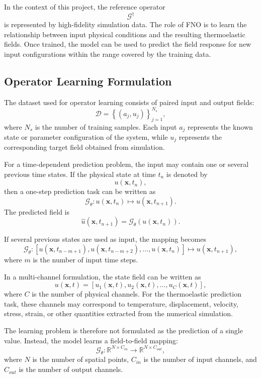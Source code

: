 \documentclass[14pt]{extarticle}
\begin{document}
In the context of this project, the reference operator
\[
\mathcal{G}^{\dagger}
\]
is represented by high-fidelity simulation data. The role of FNO is to learn the relationship between input physical conditions and the resulting thermoelastic fields. Once trained, the model can be used to predict the field response for new input configurations within the range covered by the training data.

\subsection{Operator Learning Formulation}

The dataset used for operator learning consists of paired input and output fields:
\[
\mathcal{D}
=
\left\{
\left(
a_j,
u_j
\right)
\right\}_{j=1}^{N_s},
\]
where \(N_s\) is the number of training samples. Each input \(a_j\) represents the known state or parameter configuration of the system, while \(u_j\) represents the corresponding target field obtained from simulation.

For a time-dependent prediction problem, the input may contain one or several previous time states. If the physical state at time \(t_n\) is denoted by
\[
u(\mathbf{x}, t_n),
\]
then a one-step prediction task can be written as
\[
\mathcal{G}_{\theta}:
u(\mathbf{x}, t_n)
\mapsto
u(\mathbf{x}, t_{n+1}).
\]
The predicted field is
\[
\hat{u}(\mathbf{x}, t_{n+1})
=
\mathcal{G}_{\theta}
\left(
u(\mathbf{x}, t_n)
\right).
\]

If several previous states are used as input, the mapping becomes
\[
\mathcal{G}_{\theta}:
\left[
u(\mathbf{x}, t_{n-m+1}),
u(\mathbf{x}, t_{n-m+2}),
\ldots,
u(\mathbf{x}, t_n)
\right]
\mapsto
u(\mathbf{x}, t_{n+1}),
\]
where \(m\) is the number of input time steps.

In a multi-channel formulation, the state field can be written as
\[
u(\mathbf{x}, t)
=
\left[
u_1(\mathbf{x}, t),
u_2(\mathbf{x}, t),
\ldots,
u_C(\mathbf{x}, t)
\right],
\]
where \(C\) is the number of physical channels. For the thermoelastic prediction task, these channels may correspond to temperature, displacement, velocity, stress, strain, or other quantities extracted from the numerical simulation.

The learning problem is therefore not formulated as the prediction of a single value. Instead, the model learns a field-to-field mapping:
\[
\mathcal{G}_{\theta}:
\mathbb{R}^{N \times C_{in}}
\rightarrow
\mathbb{R}^{N \times C_{out}},
\]
where \(N\) is the number of spatial points, \(C_{in}\) is the number of input channels, and \(C_{out}\) is the number of output channels.
\end{document}
